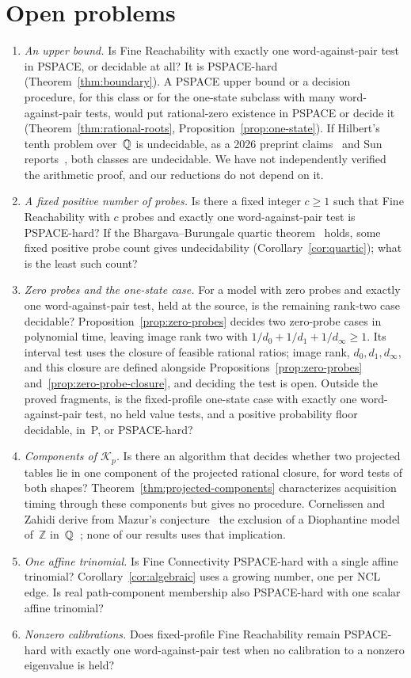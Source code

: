 
\section{Open problems}\label{sec:open}

\begin{enumerate}
\item \emph{An upper bound.} Is Fine Reachability with exactly one
word-against-pair test in PSPACE, or decidable at all? It is PSPACE-hard
(Theorem~\ref{thm:boundary}). A PSPACE upper bound or a decision procedure,
for this class or for the one-state subclass with many word-against-pair
tests, would put rational-zero existence in PSPACE or decide it
(Theorem~\ref{thm:rational-roots}, Proposition~\ref{prop:one-state}). If
Hilbert's tenth problem over~$\mathbb{Q}$ is undecidable, as a 2026 preprint
claims~\cite{openaih10q} and Sun reports~\cite[Section~1]{sun}, both
classes are undecidable. We have not independently verified the arithmetic
proof, and our reductions do not depend on it.
\item \emph{A fixed positive number of probes.} Is there a fixed integer
$c\ge1$ such that Fine Reachability with $c$ probes and exactly one
word-against-pair test is PSPACE-hard? If the Bhargava--Burungale quartic
theorem~\cite[Corollary~1.2(3)]{bhargavaburungale} holds, some fixed
positive probe count gives undecidability (Corollary~\ref{cor:quartic});
what is the least such count?
\item \emph{Zero probes and the one-state case.} For a model with
zero probes and exactly one word-against-pair test, held at the source, is
the remaining rank-two case decidable? Proposition~\ref{prop:zero-probes} decides two zero-probe
cases in polynomial time, leaving image rank two with
$1/d_0+1/d_1+1/d_\infty\ge1$. Its interval test uses the closure of
feasible rational ratios; image rank, $d_0,d_1,d_\infty$, and this closure
are defined alongside Propositions~\ref{prop:zero-probes}
and~\ref{prop:zero-probe-closure}, and deciding the test is open. Outside
the proved fragments, is the fixed-profile one-state case with exactly one
word-against-pair test, no held value tests, and a positive probability
floor decidable, in~P, or PSPACE-hard?
\item \emph{Components of $\mathcal K_p$.} Is there an algorithm that
decides whether two projected tables lie in one component of the projected
rational closure, for word tests of both shapes?
Theorem~\ref{thm:projected-components} characterizes acquisition timing
through these components but gives no procedure. Cornelissen and Zahidi
derive from Mazur's conjecture~\cite{mazur} the exclusion of a Diophantine
model of~$\mathbb Z$ in~$\mathbb{Q}$~\cite[Theorem~3.6]{cornelissenzahidi}; none of
our results uses that implication.
\item \emph{One affine trinomial.} Is Fine Connectivity PSPACE-hard with a
single affine trinomial? Corollary~\ref{cor:algebraic} uses a growing
number, one per NCL edge. Is real path-component membership also
PSPACE-hard with one scalar affine trinomial?
\item \emph{Nonzero calibrations.} Does fixed-profile Fine Reachability
remain PSPACE-hard with exactly one word-against-pair test when no
calibration to a nonzero eigenvalue is held?
\end{enumerate}
